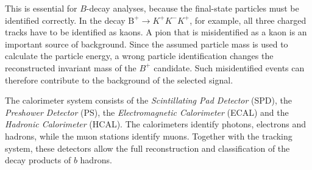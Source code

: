 This is essential for $B$-decay analyses,
because the final-state particles must be identified correctly.
In the decay $\text{B}^+ \to K^+K^-K^+$, for example,
all three charged tracks have to be identified as kaons.
A pion that is misidentified as a kaon is an important source of background.
Since the assumed particle mass is used to calculate the particle energy,
a wrong particle identification changes the reconstructed invariant mass
of the $B^+$ candidate.
Such misidentified events can therefore contribute to the background of the
selected signal.

The calorimeter system consists of the \textit{Scintillating Pad Detector}
(SPD), the \textit{Preshower Detector} (PS),
the \textit{Electromagnetic Calorimeter} (ECAL) and the
\textit{Hadronic Calorimeter} (HCAL).
The calorimeters identify photons, electrons and hadrons,
while the muon stations identify muons.
Together with the tracking system, these detectors allow the full
reconstruction and classification of the decay products of $b$ hadrons.
